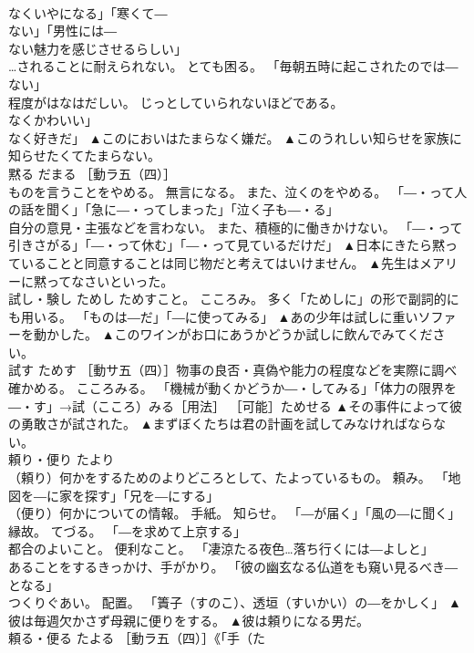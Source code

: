\documentclass[8pt]{extreport}
\begin{document}
\begin{CJK}{UTF8}{min}
\\	なくいやになる」「寒くて―
\\	ない」「男性には―
\\	ない魅力を感じさせるらしい」 
\\	…されることに耐えられない。 とても困る。 「毎朝五時に起こされたのでは―
\\	ない」 
\\	程度がはなはだしい。 じっとしていられないほどである。 
\\	なくかわいい」
\\	なく好きだ」	▲このにおいはたまらなく嫌だ。 ▲このうれしい知らせを家族に知らせたくてたまらない。
\\	黙る	だまる	［動ラ五（四）］ 
\\	ものを言うことをやめる。 無言になる。 また、泣くのをやめる。 「―・って人の話を聞く」「急に―・ってしまった」「泣く子も―・る」 
\\	自分の意見・主張などを言わない。 また、積極的に働きかけない。 「―・って引きさがる」「―・って休む」「―・って見ているだけだ」	▲日本にきたら黙っていることと同意することは同じ物だと考えてはいけません。 ▲先生はメアリーに黙ってなさいといった。
\\	試し・験し	ためし	ためすこと。 こころみ。 多く「ためしに」の形で副詞的にも用いる。 「ものは―だ」「―に使ってみる」	▲あの少年は試しに重いソファーを動かした。 ▲このワインがお口にあうかどうか試しに飲んでみてください。
\\	試す	ためす	［動サ五（四）］物事の良否・真偽や能力の程度などを実際に調べ確かめる。 こころみる。 「機械が動くかどうか―・してみる」「体力の限界を―・す」→試（こころ）みる［用法］ ［可能］ためせる	▲その事件によって彼の勇敢さが試された。 ▲まずぼくたちは君の計画を試してみなければならない。
\\	頼り・便り	たより	
\\	（頼り）何かをするためのよりどころとして、たよっているもの。 頼み。 「地図を―に家を探す」「兄を―にする」 
\\	（便り）何かについての情報。 手紙。 知らせ。 「―が届く」「風の―に聞く」 
\\	縁故。 てづる。 「―を求めて上京する」 
\\	都合のよいこと。 便利なこと。 「凄涼たる夜色…落ち行くには―よしと」 
\\	あることをするきっかけ、手がかり。 「彼の幽玄なる仏道をも窺い見るべき―となる」 
\\	つくりぐあい。 配置。 「簀子（すのこ）、透垣（すいかい）の―をかしく」	▲彼は毎週欠かさず母親に便りをする。 ▲彼は頼りになる男だ。
\\	頼る・便る	たよる	［動ラ五（四）］《「手（た　

\end{CJK}
\end{document}
